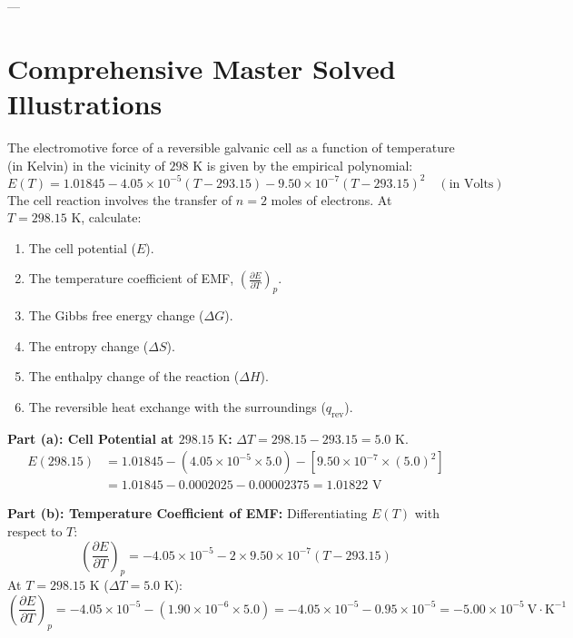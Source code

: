 ---

\section{Comprehensive Master Solved Illustrations}

\begin{examplebox}
The electromotive force of a reversible galvanic cell as a function of temperature (in Kelvin) in the vicinity of $298\text{ K}$ is given by the empirical polynomial:
\begin{equation*}
    E(T) = 1.01845 - 4.05 \times 10^{-5} (T - 293.15) - 9.50 \times 10^{-7} (T - 293.15)^2 \quad (\text{in Volts})
\end{equation*}
The cell reaction involves the transfer of $n = 2$ moles of electrons. At $T = 298.15\text{ K}$, calculate:
\begin{enumerate}[label=(\alph*)]
    \item The cell potential ($E$).
    \item The temperature coefficient of EMF, $\left(\frac{\partial E}{\partial T}\right)_p$.
    \item The Gibbs free energy change ($\Delta G$).
    \item The entropy change ($\Delta S$).
    \item The enthalpy change of the reaction ($\Delta H$).
    \item The reversible heat exchange with the surroundings ($q_{\text{rev}}$).
\end{enumerate}
\tcblower
\textbf{Part (a): Cell Potential at $298.15\text{ K}$:}
$\Delta T = 298.15 - 293.15 = 5.0\text{ K}$.
\begin{align*}
    E(298.15) &= 1.01845 - (4.05 \times 10^{-5} \times 5.0) - [9.50 \times 10^{-7} \times (5.0)^2] \\
    &= 1.01845 - 0.0002025 - 0.00002375 = 1.01822\text{ V}
\end{align*}

\textbf{Part (b): Temperature Coefficient of EMF:}
Differentiating $E(T)$ with respect to $T$:
\begin{equation*}
    \left(\frac{\partial E}{\partial T}\right)_p = -4.05 \times 10^{-5} - 2 \times 9.50 \times 10^{-7} (T - 293.15)
\end{equation*}
At $T = 298.15\text{ K}$ ($\Delta T = 5.0\text{ K}$):
\begin{equation*}
    \left(\frac{\partial E}{\partial T}\right)_p = -4.05 \times 10^{-5} - (1.90 \times 10^{-6} \times 5.0) = -4.05 \times 10^{-5} - 0.95 \times 10^{-5} = -5.00 \times 10^{-5}\ \text{V}\cdot\text{K}^{-1}
\end{equation*}


\end{examplebox}

